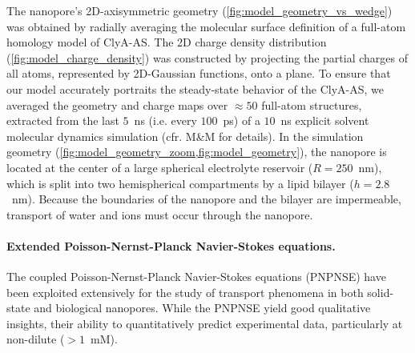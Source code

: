 \documentclass[journal=ancac3,manuscript=article,etalmode=truncate,maxauthors=0,layout=twocolumn]{achemso}
\begin{document}
The nanopore's 2D-axisymmetric geometry (\cref{fig:model_geometry_vs_wedge}) was obtained by radially
averaging the molecular surface definition of a full-atom homology model of ClyA-AS. The 2D charge density
distribution (\cref{fig:model_charge_density}) was constructed by projecting the partial charges of all
atoms, represented by 2D-Gaussian functions, onto a plane. To ensure that our model accurately portraits the
steady-state behavior of the ClyA-AS, we averaged the geometry and charge maps over $\approx50$ full-atom
structures, extracted from the last $5$~ns (i.e. every $100$~ps) of a $10$~ns explicit solvent molecular
dynamics simulation (cfr. M\&M for details). In the simulation geometry
(\cref{fig:model_geometry_zoom,fig:model_geometry}),
the nanopore is located at the center of a large spherical electrolyte reservoir ($R=250$~nm), which is split
into two hemispherical compartments by a lipid bilayer ($h=2.8$~nm). Because the boundaries of the nanopore
and the bilayer are impermeable, transport of water and ions must occur through the nanopore.



\paragraph{Extended Poisson-Nernst-Planck Navier-Stokes equations.}
The coupled Poisson-Nernst-Planck Navier-Stokes equations (PNPNSE) have been exploited extensively for the
study of transport phenomena in both solid-state\cite{Daiguji-2004,Lu-2012} and biological
nanopores.\cite{Eisenberg-1996,Simakov-2010, Pederson-2015} While the PNPNSE yield good qualitative insights,
their ability to quantitatively predict experimental data, particularly at non-dilute ($>1$~mM).
\end{document}

